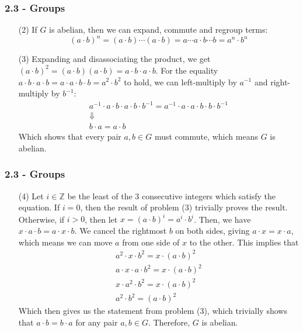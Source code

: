 \documentclass{beamer}
\begin{document}
\begin{frame}
\frametitle{2.3 - Groups}
\small
\begin{enumerate}
	\item[(2)] If $G$ is abelian, then we can expand, commute and regroup terms:
	\begin{equation*}
	(a\cdot b)^n = (a\cdot b)\cdots(a\cdot b) = a\cdots a\cdot b\cdots b = a^n\cdot b^n
	\end{equation*}
	\item[(3)] Expanding and disassociating the product, we get $(a\cdot b)^2 = (a\cdot b)(a\cdot b) = a\cdot b\cdot a\cdot b$.  For the equality $a\cdot b\cdot a\cdot b = a\cdot a\cdot b\cdot b = a^2\cdot b^2$ to hold, we can left-multiply by $a^{-1}$ and right-multiply by $b^{-1}$:
	\begin{gather*}
	a^{-1}\cdot a\cdot b\cdot a\cdot b\cdot b^{-1} = a^{-1}\cdot a\cdot a\cdot b\cdot b\cdot b^{-1} \\
	\Downarrow \\
	b\cdot a = a\cdot b
	\end{gather*}
	Which shows that every pair $a,b\in G$ must commute, which means $G$ is abelian.
\end{enumerate}
\end{frame}
\begin{frame}
\frametitle{2.3 - Groups}
\small
\begin{enumerate}
	\item[(4)] Let $i\in\mathbb Z$ be the least of the 3 consecutive integers which satisfy the equation. If $i=0$, then the result of problem (3) trivially proves the result. Otherwise, if $i>0$, then let $x=(a\cdot b)^i = a^i\cdot b^i$. Then, we have $x\cdot a\cdot b = a\cdot x\cdot b$. We cancel the rightmost $b$ on both sides, giving $a\cdot x = x\cdot a$, which means we can move $a$ from one side of $x$ to the other. This implies that
	\begin{gather*}
	a^2\cdot x\cdot b^2 = x\cdot (a\cdot b)^2 \\
	a\cdot x\cdot a\cdot b^2 = x\cdot (a\cdot b)^2 \\
	x\cdot a^2\cdot b^2 = x\cdot (a\cdot b)^2 \\
	a^2\cdot b^2 = (a\cdot b)^2
	\end{gather*}
	Which then gives us the statement from problem (3), which trivially shows that $a\cdot b = b\cdot a$ for any pair $a,b\in G$. Therefore, $G$ is abelian.
\end{enumerate}
\end{frame}
\end{document}
